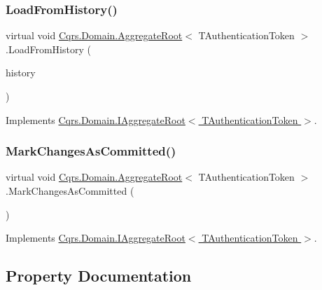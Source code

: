 \subsubsection{\texorpdfstring{Load\+From\+History()}{LoadFromHistory()}}
{\footnotesize\ttfamily virtual void \hyperlink{classCqrs_1_1Domain_1_1AggregateRoot}{Cqrs.\+Domain.\+Aggregate\+Root}$<$ T\+Authentication\+Token $>$.Load\+From\+History (\begin{DoxyParamCaption}\item[{I\+Enumerable$<$ \hyperlink{interfaceCqrs_1_1Events_1_1IEvent}{I\+Event}$<$ T\+Authentication\+Token $>$$>$}]{history }\end{DoxyParamCaption})\hspace{0.3cm}{\ttfamily [virtual]}}



Implements \hyperlink{interfaceCqrs_1_1Domain_1_1IAggregateRoot_afe9329ee26ae68613059189ca64dfe60}{Cqrs.\+Domain.\+I\+Aggregate\+Root$<$ T\+Authentication\+Token $>$}.

\mbox{\label{classCqrs_1_1Domain_1_1AggregateRoot_adab968b830e186cb832583910bf6f3a6}} 
\subsubsection{\texorpdfstring{Mark\+Changes\+As\+Committed()}{MarkChangesAsCommitted()}}
{\footnotesize\ttfamily virtual void \hyperlink{classCqrs_1_1Domain_1_1AggregateRoot}{Cqrs.\+Domain.\+Aggregate\+Root}$<$ T\+Authentication\+Token $>$.Mark\+Changes\+As\+Committed (\begin{DoxyParamCaption}{ }\end{DoxyParamCaption})\hspace{0.3cm}{\ttfamily [virtual]}}



Implements \hyperlink{interfaceCqrs_1_1Domain_1_1IAggregateRoot_af31116870bbf6566b3eec0b8bc02c6de}{Cqrs.\+Domain.\+I\+Aggregate\+Root$<$ T\+Authentication\+Token $>$}.



\subsection{Property Documentation}
\mbox{\label{classCqrs_1_1Domain_1_1AggregateRoot_ab84d521c8c3bffd3c2e58959984d1e88}} 
